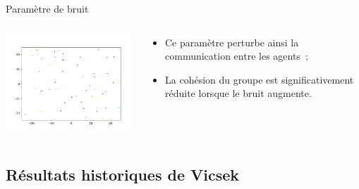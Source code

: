 \documentclass[aspectratio=43, a4paper, 12pt]{beamer}
\begin{document}
\begin{frame}{Paramètre de bruit}
\begin{columns}
			\begin{column}{0.6\paperwidth}
		       \begin{center}\includegraphics[width=8cm]{images/image_10.png}\end{center}
			\end{column}
			
			\begin{column}{0.4\paperwidth}
				\begin{itemize}
					\item<1-> Ce paramètre perturbe ainsi la communication entre les agents~;
					\item<2-> La cohésion du groupe est significativement réduite lorsque le bruit augmente.
          \end{itemize}			
			\end{column}
		\end{columns}		
	\end{frame}

\subsection{Résultats historiques de Vicsek}
\end{document}
